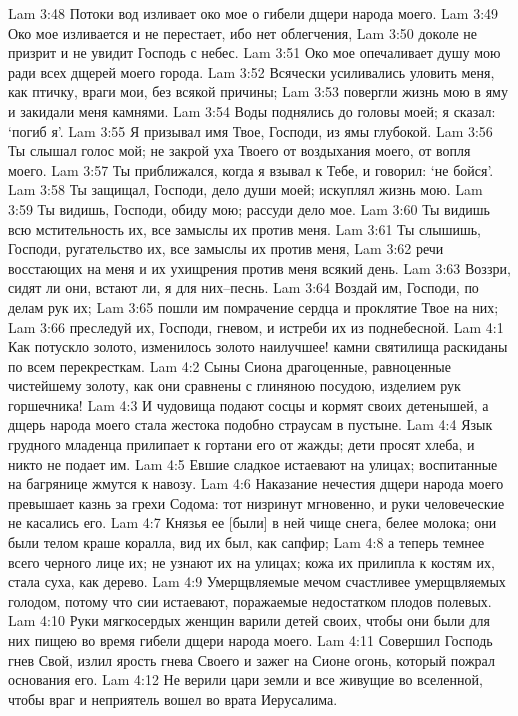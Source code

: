 Lam 3:48  Потоки вод изливает око мое о гибели дщери народа моего.
Lam 3:49  Око мое изливается и не перестает, ибо нет облегчения,
Lam 3:50  доколе не призрит и не увидит Господь с небес.
Lam 3:51  Око мое опечаливает душу мою ради всех дщерей моего города.
Lam 3:52  Всячески усиливались уловить меня, как птичку, враги мои, без всякой причины;
Lam 3:53  повергли жизнь мою в яму и закидали меня камнями.
Lam 3:54  Воды поднялись до головы моей; я сказал: `погиб я'.
Lam 3:55  Я призывал имя Твое, Господи, из ямы глубокой.
Lam 3:56  Ты слышал голос мой; не закрой уха Твоего от воздыхания моего, от вопля моего.
Lam 3:57  Ты приближался, когда я взывал к Тебе, и говорил: `не бойся'.
Lam 3:58  Ты защищал, Господи, дело души моей; искуплял жизнь мою.
Lam 3:59  Ты видишь, Господи, обиду мою; рассуди дело мое.
Lam 3:60  Ты видишь всю мстительность их, все замыслы их против меня.
Lam 3:61  Ты слышишь, Господи, ругательство их, все замыслы их против меня,
Lam 3:62  речи восстающих на меня и их ухищрения против меня всякий день.
Lam 3:63  Воззри, сидят ли они, встают ли, я для них--песнь.
Lam 3:64  Воздай им, Господи, по делам рук их;
Lam 3:65  пошли им помрачение сердца и проклятие Твое на них;
Lam 3:66  преследуй их, Господи, гневом, и истреби их из поднебесной.
Lam 4:1  Как потускло золото, изменилось золото наилучшее! камни святилища раскиданы по всем перекресткам.
Lam 4:2  Сыны Сиона драгоценные, равноценные чистейшему золоту, как они сравнены с глиняною посудою, изделием рук горшечника!
Lam 4:3  И чудовища подают сосцы и кормят своих детенышей, а дщерь народа моего стала жестока подобно страусам в пустыне.
Lam 4:4  Язык грудного младенца прилипает к гортани его от жажды; дети просят хлеба, и никто не подает им.
Lam 4:5  Евшие сладкое истаевают на улицах; воспитанные на багрянице жмутся к навозу.
Lam 4:6  Наказание нечестия дщери народа моего превышает казнь за грехи Содома: тот низринут мгновенно, и руки человеческие не касались его.
Lam 4:7  Князья ее [были] в ней чище снега, белее молока; они были телом краше коралла, вид их был, как сапфир;
Lam 4:8  а теперь темнее всего черного лице их; не узнают их на улицах; кожа их прилипла к костям их, стала суха, как дерево.
Lam 4:9  Умерщвляемые мечом счастливее умерщвляемых голодом, потому что сии истаевают, поражаемые недостатком плодов полевых.
Lam 4:10  Руки мягкосердых женщин варили детей своих, чтобы они были для них пищею во время гибели дщери народа моего.
Lam 4:11  Совершил Господь гнев Свой, излил ярость гнева Своего и зажег на Сионе огонь, который пожрал основания его.
Lam 4:12  Не верили цари земли и все живущие во вселенной, чтобы враг и неприятель вошел во врата Иерусалима.
